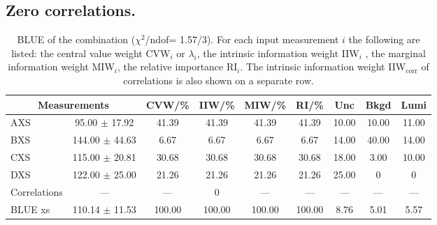 \subsection{Zero correlations.}
\begin{table}[H]
\scriptsize
\begin{center}
\renewcommand{\arraystretch}{1.1}
\begin{tabular}{|lc|c|c|c|c|ccc|}
\hline
\multicolumn{2}{|c|}{Measurements} & CVW/\%  & IIW/\%  & MIW/\%  & RI/\%  & {\tiny Unc} & {\tiny Bkgd} & {\tiny Lumi}\\
\hline
AXS &      95.00 $\pm$      17.92 &      41.39 &      41.39 &      41.39 &      41.39 &      10.00 &      10.00 &      11.00\\
BXS &     144.00 $\pm$      44.63 &       6.67 &       6.67 &       6.67 &       6.67 &      14.00 &      40.00 &      14.00\\
CXS &     115.00 $\pm$      20.81 &      30.68 &      30.68 &      30.68 &      30.68 &      18.00 &       3.00 &      10.00\\
DXS &     122.00 $\pm$      25.00 &      21.26 &      21.26 &      21.26 &      21.26 &      25.00 &  0 &  0\\
Correlations & --- & --- &  0 & --- & --- & --- & --- & ---\\
\hline
BLUE {\tiny xs} &     110.14 $\pm$      11.53 &     100.00 &     100.00 &     100.00 &     100.00 &       8.76 &       5.01 &       5.57\\
\hline
\end{tabular}
\caption{BLUE of the combination ($\chi^2$/ndof=      1.57/3).
 For each input measurement $i$ the following are listed: the central value weight CVW$_i$ or $\lambda_i$, the intrinsic information weight IIW$_i$ , the marginal information weight MIW$_i$, the relative importance RI$_i$. The intrinsic information weight IIW$_{\mathrm{corr}}$ of correlations is also shown on a separate row.}
\renewcommand{\arraystretch}{1}
\end{center}
\end{table}
